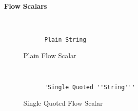 \paragraph{Flow Scalars}

\begin{figure}[H]
  \begin{minipage}[t]{0.48\textwidth}
    \vspace{0pt}
    \begin{bchart}[max=9, width=0.85\textwidth]
    \end{bchart}
  \end{minipage}
  \begin{minipage}[t]{0pt}~\end{minipage}
  \begin{minipage}[t]{0.48\textwidth}
    \vspace{0pt}
    \begin{verbatim}
      Plain String
    \end{verbatim}
  \end{minipage}
  \caption{Plain Flow Scalar}
\end{figure}

\begin{figure}[H]
  \begin{minipage}[t]{0.48\textwidth}
    \vspace{0pt}
    \begin{bchart}[max=9, width=0.85\textwidth]
    \end{bchart}
  \end{minipage}
  \begin{minipage}[t]{0pt}~\end{minipage}
  \begin{minipage}[t]{0.48\textwidth}
    \vspace{0pt}
    \begin{verbatim}
      'Single Quoted ''String'''
    \end{verbatim}
  \end{minipage}
  \caption{Single Quoted Flow Scalar}
\end{figure}

